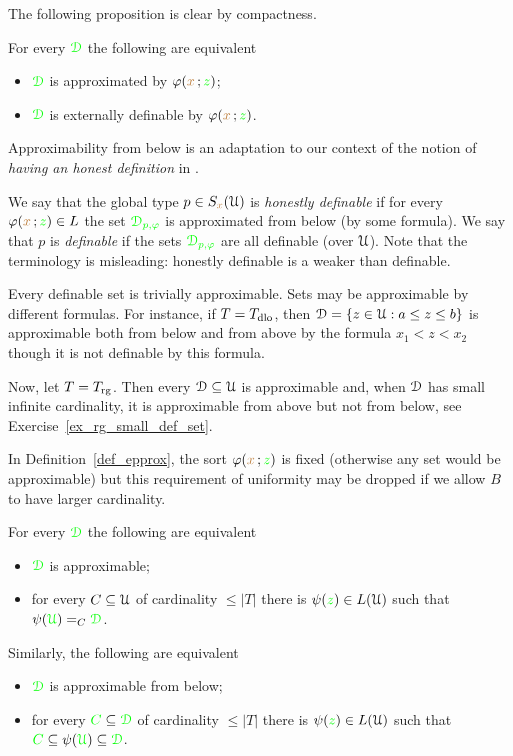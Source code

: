 \documentclass[creche.tex]{subfiles}
\begin{document}
The following proposition is clear by compactness.

\begin{proposition}\label{lem_approx=external}
For every ${\color{green}\EuScript D}$ the following are equivalent
\begin{itemize}
\item[1.] ${\color{green}\EuScript D}$ is approximated by $\varphi({\color{brown} x}\,;{\color{green} z})$;
\item[2.] ${\color{green}\EuScript D}$ is externally definable by $\varphi({\color{brown} x}\,;{\color{green} z})$.
\end{itemize}
\end{proposition}

Approximability from below is an adaptation to our context of the notion of \textit{having an honest definition} in \cite{CS}.
\begin{definition}\label{def_defble_type}
We say that the global type $p\in S_{{\color{brown} x}}(\EuScript U)$ is \emph{honestly definable\/} if for every $\varphi({\color{brown} x}\,;{\color{green} z})\in L$ the set ${\color{green}\EuScript D_{p,\varphi}}$ is approximated from below (by some formula).
We say that $p$ is \emph{definable\/} if the sets ${\color{green}\EuScript D_{p,\varphi}}$ are all definable (over $\EuScript U$).
Note that the terminology is misleading: honestly definable is a weaker than definable.
\end{definition}

\begin{example}
Every definable set is trivially approximable.
Sets may be approximable by different formulas.
For instance, if $T=T_{\rm dlo}$, then $\EuScript D=\{z\in\EuScript U:a\le z\le b\}$ is approximable both from below and from above by the formula $x_1<z<x_2$ though it is not definable by this formula.

Now, let $T=T_{\rm rg}$.
Then every $\EuScript D\subseteq\EuScript U$ is approximable and, when $\EuScript D$ has small infinite cardinality, it is approximable from above but not from below, see Exercise~\ref{ex_rg_small_def_set}.\QED
\end{example}

In Definition~\ref{def_epprox}, the sort $\varphi({\color{brown} x}\,;{\color{green} z})$ is fixed (otherwise any set would be approximable) but this requirement of uniformity may be dropped if we allow $B$ to have larger cardinality.

\begin{proposition}\label{lem_approx_nonunif}
For every ${\color{green}\EuScript D}$ the following are equivalent
\begin{itemize}
\item[1.] ${\color{green}\EuScript D}$ is approximable;
\item[2.] for every $C\subseteq\EuScript U$ of cardinality $\le|T|$ there is $\psi({\color{green} z})\in L(\EuScript U)$ such that $\psi({\color{green}\EuScript U})=_C{\color{green}\EuScript D}$.
\end{itemize}
Similarly, the following are equivalent
\begin{itemize}
\item[3.] ${\color{green}\EuScript D}$ is approximable from below;
\item[4.]  for every ${\color{green} C}\subseteq{\color{green}\EuScript D}$ of cardinality $\le|T|$ there is $\psi({\color{green} z})\in L(\EuScript U)$ such that ${\color{green} C}\subseteq \psi({\color{green}\EuScript U})\subseteq{\color{green}\EuScript D}$.
\end{itemize}
\end{proposition}
\end{document}
